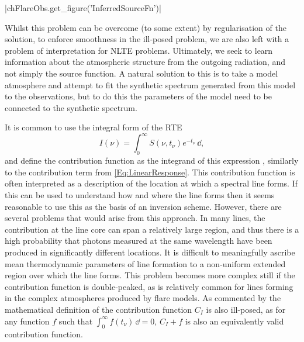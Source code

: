 \py[FlareObs]|chFlareObs.get_figure('InferredSourceFn')|

Whilst this problem can be overcome (to some extent) by regularisation of the solution, to enforce smoothness in the ill-posed problem, we are also left with a problem of interpretation for NLTE problems.
Ultimately, we seek to learn information about the atmospheric structure from the outgoing radiation, and not simply the source function.
A natural solution to this is to take a model atmosphere and attempt to fit the synthetic spectrum generated from this model to the observations, but to do this the parameters of the model need to be connected to the synthetic spectrum.


It is common to use the integral form of the RTE
\begin{equation}
    I(\nu) = \int_0^\infty S(\nu, t_\nu) e^{-t_\nu} \mathop{\dd{}t_\nu},
\end{equation}
and define the contribution function as the integrand of this expression \citep{Carlsson1997,DelToroIniesta2003}, similarly to the contribution term from \eqref{Eq:LinearResponse}.
This contribution function is often interpreted as a description of the location at which a spectral line forms.
If this can be used to understand how and where the line forms then it seems reasonable to use this as the basis of an inversion scheme.
However, there are several problems that would arise from this approach.
In many lines, the contribution at the line core can span a relatively large region, and thus there is a high probability that photons measured at the same wavelength have been produced in significantly different locations.
It is difficult to meaningfully ascribe mean thermodynamic parameters of line formation to a non-uniform extended region over which the line forms.
This problem becomes more complex still if the contribution function is double-peaked, as is relatively common for lines forming in the complex atmospheres produced by flare models.
As commented by \citet{DelToroIniesta2003} the mathematical definition of the contribution function $C_I$ is also ill-posed, as for any function $f$ such that $\int_0^\infty f(t_\nu) \mathop{\dd{}t_\nu} = 0$, $C_I + f$ is also an equivalently valid contribution function.


